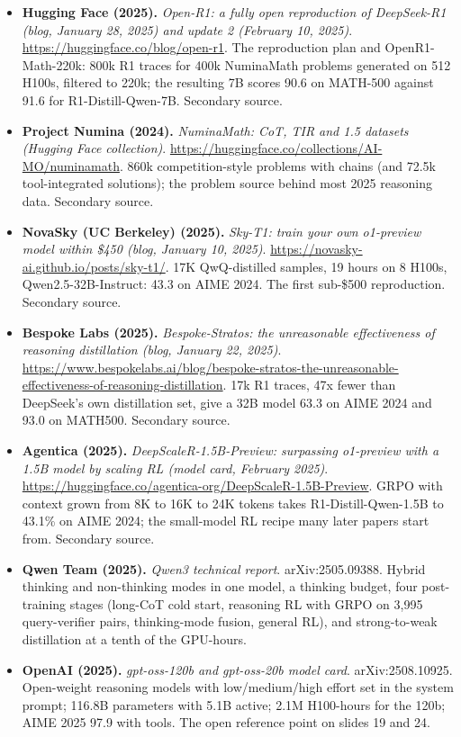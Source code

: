 \documentclass[11pt,letterpaper]{article}
\begin{document}
\begin{itemize}[leftmargin=1.2em,itemsep=3pt]
\item \textbf{Hugging Face (2025).} \textit{Open-R1: a fully open reproduction of DeepSeek-R1 (blog, January 28, 2025) and update 2 (February 10, 2025)}. \url{https://huggingface.co/blog/open-r1}. The reproduction plan and OpenR1-Math-220k: 800k R1 traces for 400k NuminaMath problems generated on 512 H100s, filtered to 220k; the resulting 7B scores 90.6 on MATH-500 against 91.6 for R1-Distill-Qwen-7B. Secondary source.
\item \textbf{Project Numina (2024).} \textit{NuminaMath: CoT, TIR and 1.5 datasets (Hugging Face collection)}. \url{https://huggingface.co/collections/AI-MO/numinamath}. 860k competition-style problems with chains (and 72.5k tool-integrated solutions); the problem source behind most 2025 reasoning data. Secondary source.
\item \textbf{NovaSky (UC Berkeley) (2025).} \textit{Sky-T1: train your own o1-preview model within \$450 (blog, January 10, 2025)}. \url{https://novasky-ai.github.io/posts/sky-t1/}. 17K QwQ-distilled samples, 19 hours on 8 H100s, Qwen2.5-32B-Instruct: 43.3 on AIME 2024. The first sub-\$500 reproduction. Secondary source.
\item \textbf{Bespoke Labs (2025).} \textit{Bespoke-Stratos: the unreasonable effectiveness of reasoning distillation (blog, January 22, 2025)}. \url{https://www.bespokelabs.ai/blog/bespoke-stratos-the-unreasonable-effectiveness-of-reasoning-distillation}. 17k R1 traces, 47x fewer than DeepSeek's own distillation set, give a 32B model 63.3 on AIME 2024 and 93.0 on MATH500. Secondary source.
\item \textbf{Agentica (2025).} \textit{DeepScaleR-1.5B-Preview: surpassing o1-preview with a 1.5B model by scaling RL (model card, February 2025)}. \url{https://huggingface.co/agentica-org/DeepScaleR-1.5B-Preview}. GRPO with context grown from 8K to 16K to 24K tokens takes R1-Distill-Qwen-1.5B to 43.1\% on AIME 2024; the small-model RL recipe many later papers start from. Secondary source.
\item \textbf{Qwen Team (2025).} \textit{Qwen3 technical report}. arXiv:2505.09388. Hybrid thinking and non-thinking modes in one model, a thinking budget, four post-training stages (long-CoT cold start, reasoning RL with GRPO on 3,995 query-verifier pairs, thinking-mode fusion, general RL), and strong-to-weak distillation at a tenth of the GPU-hours.
\item \textbf{OpenAI (2025).} \textit{gpt-oss-120b and gpt-oss-20b model card}. arXiv:2508.10925. Open-weight reasoning models with low/medium/high effort set in the system prompt; 116.8B parameters with 5.1B active; 2.1M H100-hours for the 120b; AIME 2025 97.9 with tools. The open reference point on slides 19 and 24.

\end{itemize}
\end{document}
